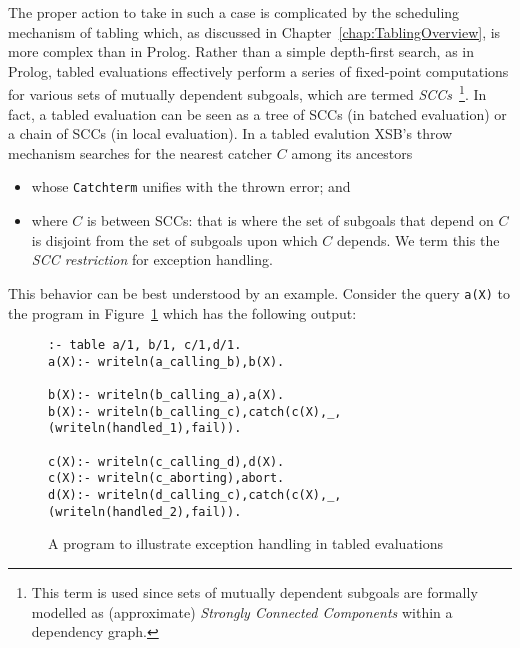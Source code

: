The proper action to take in such a case is complicated by the
scheduling mechanism of tabling which, as discussed in
Chapter~\ref{chap:TablingOverview}, is more complex than in Prolog.
Rather than a simple depth-first search, as in Prolog, tabled
evaluations effectively perform a series of fixed-point computations
for various sets of mutually dependent subgoals, which are termed {\em
  SCCs}~\footnote{This term is used since sets of mutually dependent
  subgoals are formally modelled as (approximate) {\em Strongly
    Connected Components} within a dependency graph.}.  In fact, a
tabled evaluation can be seen as a tree of SCCs (in batched
evaluation) or a chain of SCCs (in local evaluation).  In a tabled
evalution XSB's throw mechanism searches for the nearest catcher $C$
among its ancestors
%
\begin{itemize}
\item whose {\tt Catchterm} unifies with the thrown error; and
\item where $C$ is between SCCs: that is where the set of subgoals
  that depend on $C$ is disjoint from the set of subgoals upon which
  $C$ depends.  We term this the {\em SCC restriction} for exception
  handling.
\end{itemize}
%

This behavior can be best understood by an example.  Consider the
query {\tt a(X)} to the program in Figure~\ref{fig:tab_except} which
has the following output:
%
\begin{figure}[bhtp]
\longline
\begin{small}
\begin{verbatim}
:- table a/1, b/1, c/1,d/1.
a(X):- writeln(a_calling_b),b(X).

b(X):- writeln(b_calling_a),a(X).
b(X):- writeln(b_calling_c),catch(c(X),_,(writeln(handled_1),fail)).

c(X):- writeln(c_calling_d),d(X).
c(X):- writeln(c_aborting),abort.
d(X):- writeln(d_calling_c),catch(c(X),_,(writeln(handled_2),fail)).
\end{verbatim}
\end{small}
\caption{A program to illustrate exception handling in tabled evaluations} \label{fig:tab_except}
\longline
\end{figure}


